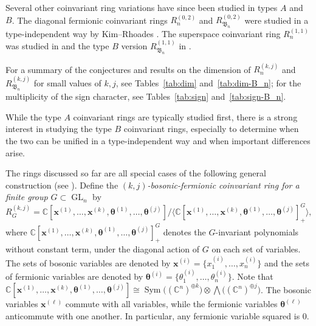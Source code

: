 \documentclass[12pt]{amsart}
\theoremstyle{plain}
\theoremstyle{definition}
\DeclareMathOperator{\GL}{GL}
\DeclareMathOperator{\Sym}{Sym}
\newcommand{\C}{\mathbb{C}}
\begin{document}
Several other coinvariant ring variations have since been studied in types $A$ and $B$.
The diagonal fermionic coinvariant rings $R_n^{(0,2)}$ and $R_{\mathfrak{B}_n}^{(0,2)}$ were studied in a type-independent way by Kim--Rhoades \cite{MR4381935}.
The superspace coinvariant ring $R_n^{(1,1)}$ was studied in \cite{Angarone2025, fields2025, RhoadesWilson2023, SwansonWallach1, SwansonWallachII} and the type $B$ version $R_{\mathfrak{B}_n}^{(1,1)}$ in \cite{bhattacharya, RhoadesBhattacharya, MR4674564, SwansonWallach1, SwansonWallachII}.

For a summary of the conjectures and results on the dimension of $R_n^{(k,j)}$ and $R_{\mathfrak{B}_n}^{(k,j)}$ for small values of $k,j$, see Tables~\ref{tab:dim} and~\ref{tab:dim-B_n}; 
for the multiplicity of the sign character, see Tables~\ref{tab:sign} and~\ref{tab:sign-B_n}.

While the type $A$ coinvariant rings are typically studied first, there is a strong interest in studying the type $B$ coinvariant rings, especially to determine when the two can be unified in a type-independent way and when important differences arise.

The rings discussed so far are all special cases of the following general construction (see \cite{Bergeron2013, BergeronOPAC, Bergeron2020, Lentfer-Supersymmetry}).
Define the \emph{$(k,j)$-bosonic-fermionic coinvariant ring for a finite group $G \subset \GL_n$} by
\begin{equation}\label{eq:coinv} R_G^{(k,j)} = \C[\bm{x}^{(1)}, \ldots, \bm{x}^{(k)}, \bm{\theta}^{(1)}, \ldots, \bm{\theta}^{(j)}]/\langle \C[\bm{x}^{(1)}, \ldots, \bm{x}^{(k)}, \bm{\theta}^{(1)}, \ldots, \bm{\theta}^{(j)}]_+^{G} \rangle,\end{equation}
where $\C[\bm{x}^{(1)}, \ldots, \bm{x}^{(k)}, \bm{\theta}^{(1)}, \ldots, \bm{\theta}^{(j)}]^G_+$ denotes the $G$-invariant polynomials without constant term, under the diagonal action of $G$ on each set of variables.
The sets of bosonic variables are denoted by $\bm{x}^{(i)} = \{ x^{(i)}_1,\ldots,x^{(i)}_n \}$ and the sets of fermionic variables are denoted by $\bm{\theta}^{(i)} = \{ \theta^{(i)}_1,\ldots,\theta^{(i)}_n \}$.
Note that $\C[\bm{x}^{(1)},\ldots,\bm{x}^{(k)},
     \bm{\theta}^{(1)},\ldots,\bm{\theta}^{(j)}] \cong
   \Sym\big((\C^n)^{\oplus k}\big) \otimes
   {\textstyle\bigwedge}\big((\C^n)^{\oplus j}\big)$.
The bosonic variables $\bm{x}^{(\ell)}$ commute with all variables, while the fermionic variables $\bm{\theta}^{(\ell)}$ anticommute with one another.
In particular, any fermionic variable squared is $0$.
\end{document}
